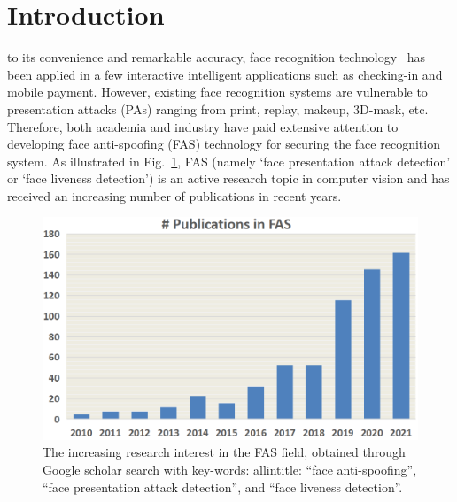 \documentclass[10pt,journal,compsoc]{IEEEtran}
\begin{document}
%
\IEEEpeerreviewmaketitle


\ifCLASSOPTIONcompsoc
{}
\else
\section{Introduction}
\label{sec:introduction}
\fi




 to its convenience and remarkable accuracy, face recognition technology~\cite{guo2020learning} has been applied in a few interactive intelligent applications such as checking-in and mobile payment. However, existing face recognition systems are vulnerable to presentation attacks (PAs) ranging from print, replay, makeup, 3D-mask, etc. Therefore, both academia and industry have paid extensive attention to developing face anti-spoofing (FAS) technology for securing the face recognition system. As illustrated in Fig.~\ref{fig:Figure1}, FAS (namely `face presentation attack detection' or `face liveness detection') is an active research topic in computer vision and has received an increasing number of publications in recent years.


\begin{figure}
\centering
\includegraphics[scale=0.5]{Figures/Fig1.png}
\vspace{-1.4em}
  \caption{ 
  The increasing research interest in the FAS field, obtained through Google scholar search with key-words: allintitle: “face anti-spoofing”, “face presentation attack detection”, and “face liveness detection”.}
\label{fig:Figure1}
\vspace{-1.2em}
\end{figure}
\end{document}
